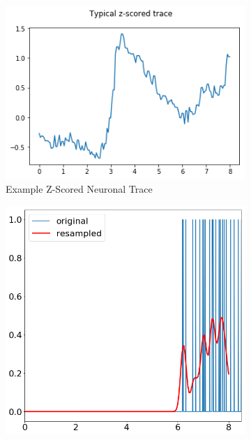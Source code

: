 \documentclass[a4paper,10pt]{article}
\begin{document}
\begin{figure}
    \centering
    \begin{subfigure}[b]{0.4\textwidth}
        \includegraphics[width=\textwidth]{img/example_neuro_channel_zscored.png}
        \caption{Example Z-Scored Neuronal Trace}
        \label{fig:example_neuro_channel_zscored}
    \end{subfigure}\hspace{0.05\textwidth}
    \begin{subfigure}[b]{0.4\textwidth}
        \includegraphics[width=\textwidth]{img/example_lick_rate_resampled.png}

\end{subfigure}
\end{figure}
\end{document}
